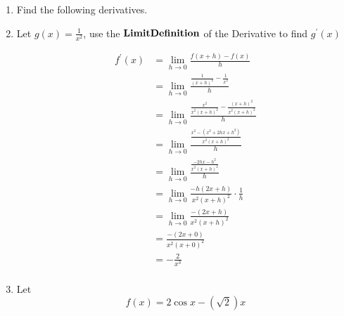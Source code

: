 \documentclass{exam}
\begin{document}
\begin{enumerate}



\newpage

\item Find the following derivatives.



\item Let $g(x)=\frac{1}{x^{2}}$, use the $\bf{Limit Definition}$ of the Derivative to find $g^{\prime}(x)$

\begin{align*}
f^{\prime}(x) & = \lim_{h\rightarrow 0}\frac{f(x+h)-f(x)}{h}\\
      & = \lim_{h\rightarrow 0}\frac{\frac{1}{(x+h)^{2}}-\frac{1}{x^{2}}}{h}\\
      & = \lim_{h\rightarrow 0}\frac{\frac{x^{2}}{x^{2}(x+h)^{2}}-\frac{(x+h)^{2}}{x^{2}(x+h)^{2}}}{h}\\
      & = \lim_{h\rightarrow 0}\frac{\frac{x^{2}-(x^{2}+2hx+h^{2})}{x^{2}(x+h)^{2}}}{h}\\
      & = \lim_{h\rightarrow 0}\frac{\frac{-2hx-h^{2}}{x^{2}(x+h)^{2}}}{h}\\
      & = \lim_{h\rightarrow 0}\frac{-h(2x+h)}{x^{2}(x+h)^{2}}\cdot \frac{1}{h}\\
      & = \lim_{h\rightarrow 0}\frac{-(2x+h)}{x^{2}(x+h)^{2}}\\
      & = \frac{-(2x+0)}{x^{2}(x+0)^{2}}\\
      & = -\frac{2}{x^{3}}\\
\end{align*}

\newpage

\item
Let
\[ 
f(x)=2\cos{x}-(\sqrt{2})x
\]
\begin{parts}

\end{parts}
\end{enumerate}
\end{document}
